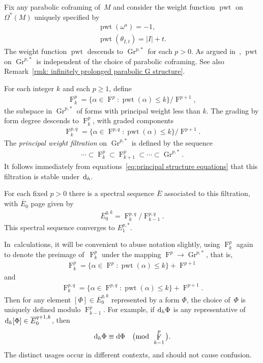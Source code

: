 \documentclass[pdftex]{sigma}
\DeclareMathOperator{\Gr}{Gr}
\renewcommand{\d}{{\rm d}}
\renewcommand{\mod}[1]{\quad\big(\mathrm{mod\enspace} #1\big)}
\newcommand{\thetas}[1]{\theta_{#1}}
\DeclareMathOperator{\pwf}{F}
\DeclareMathOperator{\pwt}{\mathrm{pwt}}
\renewcommand{\dh}{\ensuremath{\hspace{1pt} \d_h}}
\numberwithin{equation}{section}
\begin{document}
\begin{Example}
 Fix any parabolic coframing of~$M$ and consider the weight function $\pwt$ on $\Omega^*(M)$ uniquely specified by
 \begin{gather*}
 \pwt(\omega^a) = -1,
 \\
 \pwt(\thetas{I,t}) = |I| + t .
 \end{gather*}
 The weight function $\pwt$ descends to $\Gr^{p,*}$ for each $p>0$. As argued in~\cite{Characteristic_Cohomology_I}, $\pwt$ on $\Gr^{p,*}$ is independent of the choice of parabolic coframing. See also Remark~\ref{rmk: infinitely prolonged parabolic G structure}.

 For each integer $k$ and each $p \ge 1$, define
 \begin{gather*}
 \pwf^{p}_k =\big \{ \alpha \in \pwf^p \colon \pwt(\alpha) \le k\big \}/\pwf^{p+1} ,
 \end{gather*}
 the subspace in $\Gr^{p,*}$ of forms with principal weight less than $k$.
 The grading by form degree descends to $\pwf^p_k$, with graded components
 \begin{gather*}
 \pwf^{p,q}_k = \big\{ \alpha \in \pwf^{p,q} \colon \pwt(\alpha) \le k\big \}/\pwf^{p+1} .
 \end{gather*}
 The \emph{principal weight filtration} on $\Gr^{p,*}$ is defined by the sequence
 \begin{gather*}
 \cdots \subset \pwf^{p}_k \subset \pwf^{p}_{k+1} \subset \cdots \subset \Gr^{p,*} .
 \end{gather*}
 It follows immediately from equations~\eqref{eq:principal structure equations} that this filtration is stable under $\dh$.

 For each fixed $p>0$ there is a spectral sequence $\overline{E}$ associated to this filtration, with $\overline{E}_0$ page given by
 \begin{gather*}
 \overline{E}_0^{q,k} = \pwf^{p,q}_k/\pwf^{p,q}_{k-1} .
 \end{gather*}
 This spectral sequence converges to $E^{p,*}_1$.

 In~calculations, it will be convenient to abuse notation slightly, using $\pwf^p_k$ again to denote the preimage of~$\pwf^p_k$ under the mapping $\pwf^p \to \Gr^{p,*}$, that is,
 \begin{gather*}
 \pwf^p_k = \big\{ \alpha \in \pwf^p \colon \pwt(\alpha) \le k \big\} + \pwf^{p+1}
 \end{gather*}
 and
 \begin{gather*}
 \pwf^{p,q}_k = \big\{ \alpha \in \pwf^{p,q} \colon \pwt(\alpha) \le k \big\} + \pwf^{p+1} .
 \end{gather*}
 Then for any element $[\Phi] \in \overline{E}_0^{q,k}$ represented by a form $\Phi$, the choice of~$\Phi$ is uniquely defined modulo $\pwf^p_{k-1}$. For example, if $\dh\Phi$ is any representative of~$\dh[\Phi] \in \overline{E}_0^{q+1,k}$, then{\samepage
 \begin{gather*}
 \dh \Phi \equiv \d\Phi \mod{\pwf^p_{k-1}} .
 \end{gather*}
 The distinct usages occur in different contexts, and should not cause confusion.
 }


\end{Example}
\end{document}
